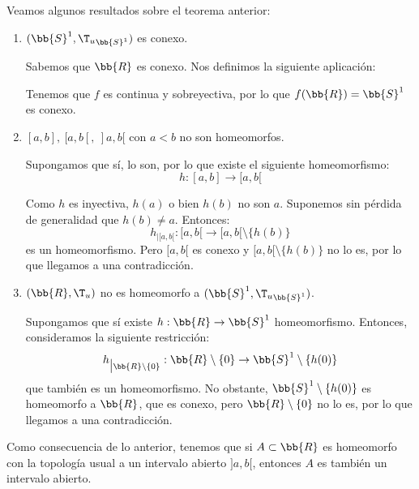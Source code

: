 \begin{ejemplo}
    Veamos algunos resultados sobre el teorema anterior:
    \begin{enumerate}
        \item $(\bb{S}^1, {\T_u}_{\bb{S}^1})$ es conexo.

        Sabemos que $\bb{R}$ es conexo. Nos definimos la siguiente aplicación:

        Tenemos que $f$ es continua y sobreyectiva, por lo que $f(\bb{R})=\bb{S}^1$ es conexo.

        \item $[a,b],~[a,b[, ~]a,b[$ con $a<b$ no son homeomorfos.

        Supongamos que sí, lo son, por lo que existe el siguiente homeomorfismo:
        \begin{equation*}
            h:[a,b]\to [a,b[
        \end{equation*}

        Como $h$ es inyectiva, $h(a)$ o bien $h(b)$ no son $a$. Suponemos sin pérdida de generalidad que $h(b)\neq a$. Entonces:
        \begin{equation*}
            h_{\big| [a,b[}:[a,b[\longrightarrow [a,b[\setminus \{h(b)\}
        \end{equation*}
        es un homeomorfismo. Pero $[a,b[$ es conexo y $[a,b[\setminus \{h(b)\}$ no lo es, por lo que llegamos a una contradicción.

        \item $(\bb{R}, \T_u)$ no es homeomorfo a $(\bb{S}^1, {\T_u}_{\bb{S}^1})$.

        Supongamos que sí existe $h:\bb{R}\to \bb{S}^1$ homeomorfismo. Entonces, consideramos la siguiente restricción:
        \begin{equation*}
            h_{\big | \bb{R}\setminus \{0\}}: \bb{R}\setminus \{0\} \to \bb{S}^1\setminus \{h(0)\}
        \end{equation*}
        que también es un homeomorfismo. No obstante, $ \bb{S}^1\setminus \{h(0)\}$ es homeomorfo a $\bb{R}$, que es conexo, pero $\bb{R}\setminus \{0\}$ no lo es, por lo que llegamos a una contradicción.
    \end{enumerate}
\end{ejemplo}

Como consecuencia de lo anterior, tenemos que si $A\subset \bb{R}$ es homeomorfo con la topología usual a un intervalo abierto $]a,b[$, entonces $A$ es también un intervalo abierto.


